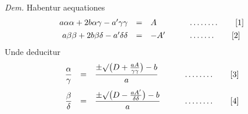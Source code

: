 \textit{Dem.} Habentur aequationes
\[
\begin{array}{rcll}
a\alpha\alpha+2b\alpha\gamma-a'\gamma\gamma&=&A&\qquad\mathinner{\ldotp\ldotp\ldotp\ldotp\ldotp\ldotp\ldotp\ldotp}\qquad[1]\\[4pt]
a\beta\beta+2b\beta\delta-a'\delta\delta&=&-A'&\qquad\mathinner{\ldotp\ldotp\ldotp\ldotp\ldotp\ldotp\ldotp}\qquad[2]
\end{array}
\]
Unde deducitur
\[
\begin{array}{rcll}
\dfrac{\alpha}{\gamma}&=&\dfrac{\pm\surd\bigl(D+\frac{aA}{\gamma\gamma}\bigr)-b}{{a}}&\qquad\mathinner{\ldotp\ldotp\ldotp\ldotp\ldotp\ldotp\ldotp\ldotp}\qquad[3]\\[12pt]
\dfrac{\beta}{\delta}&=&\dfrac{\pm\surd\bigl(D-\frac{aA'}{\delta\delta}\bigr)-b}{a}&\qquad\mathinner{\ldotp\ldotp\ldotp\ldotp\ldotp\ldotp\ldotp\ldotp}\qquad[4]
\end{array}
\]
